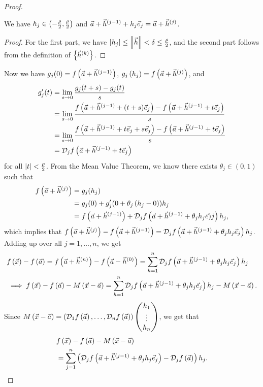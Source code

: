 \documentclass[main.tex]{subfiles}
\begin{document}
\begin{proof}
    \begin{claim}
        We have $h_j\in \left( -\frac{\rho}{2}, \frac{\rho}{2} \right)$ and $\vec{a} + \vec{h}^{(j - 1)} + h_j\vec{e}_j = \vec{a} + \vec{h}^{(j)}$.
    \end{claim}

    \begin{proof}
        For the first part, we have $\left\lvert h_j \right\rvert \le \left\lVert \vec{h} \right\rVert < \delta \le \frac{\rho}{2}$, and the second part follows from the definition of $\left\{ \vec{h}^{(k)} \right\}$.
    \end{proof}

    Now we have $g_j(0) = f\left( \vec{a} + \vec{h}^{(j - 1)} \right)$, $g_j\left( h_j \right) = f\left( \vec{a} + \vec{h}^{(j)} \right)$, and 
    \begin{align*}
        g'_j(t) &= \lim_{s\to 0} \frac{g_j(t + s) - g_j(t)}{s} \\
        &= \lim_{s\to 0} \frac{f\left( \vec{a} + \vec{h}^{(j - 1)} + (t + s)\vec{e}_j \right) - f\left( \vec{a} + \vec{h}^{(j - 1)} + t\vec{e}_j \right)}{s} \\
        &= \lim_{s\to 0} \frac{f\left( \vec{a} + \vec{h}^{(j - 1)} + t\vec{e}_j + s\vec{e}_j \right) - f\left( \vec{a} + \vec{h}^{(j - 1)} + t\vec{e}_j \right)}{s} \\
        &= \mathcal{D}_j f\left( \vec{a} + \vec{h}^{(j - 1)} + t\vec{e}_j \right)
    \end{align*}
    for all $\left\lvert t \right\rvert < \frac{\rho}{2}$. From the Mean Value Theorem, we know there exists $\theta_j\in (0, 1)$ such that
    \begin{align*}
        f\left( \vec{a} + \vec{h}^{(j)} \right) &= g_j(h_j) \\
        &= g_j(0) + g_j'(0 + \theta_j\left( h_j - 0 \right))h_j \\
        &= f\left( \vec{a} + \vec{h}^{(j - 1)} \right) + \mathcal{D}_jf\left( \vec{a} + \vec{h}^{(j - 1)} + \theta_j h_j\vec{e})j \right)h_j,
    \end{align*}
    which implies that $f\left( \vec{a} + \vec{h}^{(j)} \right) - f\left( \vec{a} + \vec{h}^{(j - 1)} \right) = \mathcal{D}_jf\left( \vec{a} + \vec{h}^{(j - 1)} + \theta_jh_j\vec{e}_j \right)h_j$. Adding up over all $j = 1, \ldots , n$, we get
    \begin{align*}
        &f\left( \vec{x} \right) - f\left( \vec{a} \right) = f\left( \vec{a} + \vec{h}^{(n)} \right) - f\left( \vec{a} - \vec{h}^{(0)} \right) = \sum_{h = 1}^n \mathcal{D}_jf\left( \vec{a} + \vec{h}^{(j - 1)} + \theta_jh_j\vec{e}_j \right)h_j \\
        &\implies f\left( \vec{x} \right) - f\left( \vec{a} \right) - M\left( \vec{x} - \vec{a} \right) = \sum_{h = 1}^n \mathcal{D}_jf\left( \vec{a} + \vec{h}^{(j - 1)} + \theta_jh_j\vec{e}_j \right)h_j - M\left( \vec{x} - \vec{a} \right).
    \end{align*}
    Since $M\left( \vec{x} - \vec{a} \right) = \left( \mathcal{D}_1 f\left( \vec{a} \right), \ldots , \mathcal{D}_n f\left( \vec{a} \right) \right)\begin{pmatrix}
        h_1 \\ \vdots \\ h_n
    \end{pmatrix}$, we get that
    \begin{align*}
        &f\left( \vec{x} \right) - f\left( \vec{a} \right) - M\left( \vec{x} - \vec{a} \right) \\
        &= \sum_{j = 1}^n \left( \mathcal{D}_jf\left( \vec{a} + \vec{h}^{(j - 1)} + \theta_jh_j\vec{e}_j \right) - \mathcal{D}_jf\left( \vec{a} \right) \right)h_j.
    \end{align*}


\end{proof}
\end{document}
